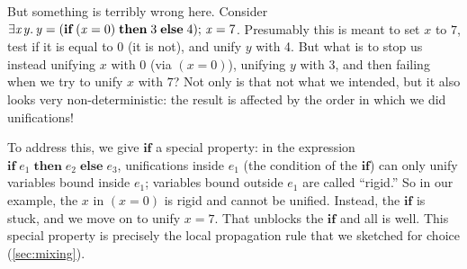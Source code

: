 \documentclass[acmsmall,review,anonymous,dvipsnames]{acmart}
\newcommand{\Varid}[1]{\mathit{#1}}
\begin{document}
But something is terribly wrong here.  Consider \ensuremath{\exists\Varid{x}\hspace{0.3mm}\Varid{y}.\,\Varid{y}\mathrel{=}(\textbf{if}\;(\Varid{x}\mathrel{=}\mathrm{0})\;\textbf{then}\;\mathrm{3}\;\textbf{else}\;\mathrm{4});\,\Varid{x}\mathrel{=}\mathrm{7}}.  Presumably this is meant
to set \ensuremath{\Varid{x}} to \ensuremath{\mathrm{7}}, test if it is equal to \ensuremath{\mathrm{0}} (it is not), and unify \ensuremath{\Varid{y}} with 4.
But what is to stop us instead unifying \ensuremath{\Varid{x}} with \ensuremath{\mathrm{0}} (via \ensuremath{(\Varid{x}\mathrel{=}\mathrm{0})}), unifying \ensuremath{\Varid{y}} with \ensuremath{\mathrm{3}}, and then
failing when we try to unify \ensuremath{\Varid{x}} with \ensuremath{\mathrm{7}}?  Not only is that not what we intended, but it also looks very
non-deterministic: the result is affected by the order in which we did unifications!

To address this, we give \ensuremath{\textbf{if}} a special property: in the expression \ensuremath{\textbf{if}\;\Varid{e}_{\mathrm{1}}\;\textbf{then}\;\Varid{e}_{\mathrm{2}}\;\textbf{else}\;\Varid{e}_{\mathrm{3}}}, unifications inside \ensuremath{\Varid{e}_{\mathrm{1}}} (the condition of the \ensuremath{\textbf{if}})
can only unify variables bound inside \ensuremath{\Varid{e}_{\mathrm{1}}}; variables bound outside \ensuremath{\Varid{e}_{\mathrm{1}}} are called ``rigid.''  So in our example, the \ensuremath{\Varid{x}} in \ensuremath{(\Varid{x}\mathrel{=}\mathrm{0})} is
rigid and cannot be unified.  Instead, the \ensuremath{\textbf{if}} is stuck, and we move on to unify \ensuremath{\Varid{x}\mathrel{=}\mathrm{7}}.  That unblocks
the \ensuremath{\textbf{if}} and all is well.  This special property is precisely the local propagation rule that we sketched for
choice (\cref{sec:mixing}).
\end{document}
